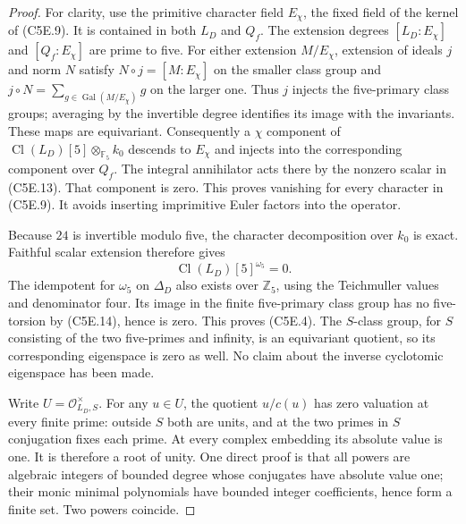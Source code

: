 \begin{proof}
For clarity, use the primitive character field $E_\chi$,
the fixed field of the kernel of (C5E.9).
It is contained in both $L_D$ and $Q_f$.
The extension degrees $[L_D:E_\chi]$ and $[Q_f:E_\chi]$
are prime to five.  For either extension $M/E_\chi$, extension
of ideals $j$ and norm $N$ satisfy $N\circ j=[M:E_\chi]$
on the smaller class group and
$j\circ N=\sum_{g\in\operatorname{Gal}(M/E_\chi)}g$ on the larger one.
Thus $j$ injects the five-primary class groups; averaging by
the invertible degree identifies its image with the invariants.
These maps are equivariant.
Consequently a $\chi$ component of
$\operatorname{Cl}(L_D)[5]\otimes_{\mathbb F_5}k_0$ descends
to $E_\chi$ and injects into the corresponding component over
$Q_f$.  The integral annihilator acts there by the nonzero scalar
in (C5E.13).  That component is zero.
This proves vanishing for every character in (C5E.9).
It avoids inserting imprimitive Euler factors into the operator.

Because $24$ is invertible modulo five, the character
decomposition over $k_0$ is exact.  Faithful scalar extension
therefore gives
\[
                   \operatorname{Cl}(L_D)[5]^{\omega_5}=0.
 \tag{C5E.14}
\]
The idempotent for $\omega_5$ on $\Delta_D$ also exists over
$\mathbb Z_5$, using the Teichmuller values and denominator four.
Its image in the finite five-primary class group has no
five-torsion by (C5E.14), hence is zero.  This proves (C5E.4).
The $S$-class group, for $S$ consisting of the two five-primes
and infinity, is an equivariant quotient, so its corresponding
eigenspace is zero as well.  No claim about the inverse
cyclotomic eigenspace has been made.

Write $U=\mathcal O_{L_D,S}^{\times}$.
For any $u\in U$, the quotient $u/c(u)$ has zero valuation
at every finite prime: outside $S$ both are units, and at
the two primes in $S$ conjugation fixes each prime.
At every complex embedding its absolute value is one.
It is therefore a root of unity.  One direct proof is that
all powers are algebraic integers of bounded degree whose
conjugates have absolute value one; their monic minimal
polynomials have bounded integer coefficients, hence form
a finite set.  Two powers coincide.


\end{proof}
